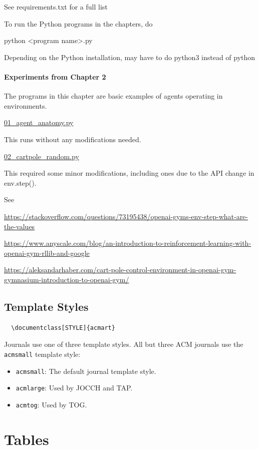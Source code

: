 \documentclass[acmlarge,screen]{acmart}
\begin{document}
See requirements.txt for a full list


To run the Python programs in the chapters, do

python <program name>.py

Depending on the Python installation, may have to do python3 instead of python


\paragraph{Experiments from Chapter 2} The programs in this chapter are basic examples of agents operating in environments.

\underline{01\_agent\_anatomy.py}

This runs without any modifications needed.

\underline{02\_cartpole\_random.py}

This required some minor modifications, including ones due to the API change in env.step().

See

\noindent \url{https://stackoverflow.com/questions/73195438/openai-gyms-env-step-what-are-the-values}

\noindent \url{https://www.anyscale.com/blog/an-introduction-to-reinforcement-learning-with-openai-gym-rllib-and-google}

\noindent \url{https://aleksandarhaber.com/cart-pole-control-environment-in-openai-gym-gymnasium-introduction-to-openai-gym/}






\subsection{Template Styles}


\begin{verbatim}
  \documentclass[STYLE]{acmart}
\end{verbatim}

Journals use one of three template styles. All but three ACM journals use the {\verb|acmsmall|} template style:
\begin{itemize}
\item {\verb|acmsmall|}: The default journal template style.
\item {\verb|acmlarge|}: Used by JOCCH and TAP.
\item {\verb|acmtog|}: Used by TOG.
\end{itemize}


\section{Tables}
\end{document}
